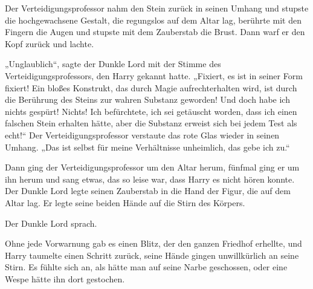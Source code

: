 Der Verteidigungsprofessor nahm den Stein zurück in seinen Umhang und stupste die hochgewachsene Gestalt, die regungslos auf dem Altar lag, berührte mit den Fingern die Augen und stupste mit dem Zauberstab die Brust. Dann warf er den Kopf zurück und lachte.

„Unglaublich“, sagte der Dunkle Lord mit der Stimme des Verteidigungsprofessors, den Harry gekannt hatte.
„Fixiert, es ist in seiner Form fixiert! Ein bloßes Konstrukt, das durch Magie aufrechterhalten wird, ist durch die Berührung des Steins zur wahren Substanz geworden! Und doch habe ich nichts gespürt! Nichts! Ich befürchtete, ich sei getäuscht worden, dass ich einen falschen Stein erhalten hätte, aber die Substanz erweist sich bei jedem Test als echt!“
Der Verteidigungsprofessor verstaute das rote Glas wieder in seinen Umhang.
„Das ist selbst für meine Verhältnisse unheimlich, das gebe ich zu.“

Dann ging der Verteidigungsprofessor um den Altar herum, fünfmal ging er um ihn herum und sang etwas, das so leise war, dass Harry es nicht hören konnte.
Der Dunkle Lord legte seinen Zauberstab in die Hand der Figur, die auf dem Altar lag.
Er legte seine beiden Hände auf die Stirn des Körpers.

Der Dunkle Lord sprach. 

Ohne jede Vorwarnung gab es einen Blitz, der den ganzen Friedhof erhellte, und Harry taumelte einen Schritt zurück, seine Hände gingen unwillkürlich an seine Stirn. Es fühlte sich an, als hätte man auf seine Narbe geschossen, oder eine Wespe hätte ihn dort gestochen.

